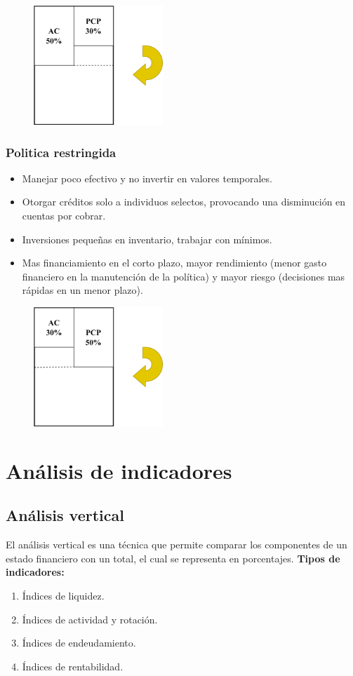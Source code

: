 \documentclass{templateNote}
\begin{document}
\begin{figure}[H]
    \centering
    \includegraphics[height=4.5cm]{img/polirelajada.png}
\end{figure}

\subsubsection{Politica restringida}
\begin{itemize}
    \item Manejar poco efectivo y no invertir en valores temporales.
    \item Otorgar créditos solo a individuos selectos, provocando una disminución en cuentas por cobrar.
    \item Inversiones pequeñas en inventario, trabajar con mínimos.
    \item Mas financiamiento en el corto plazo, mayor rendimiento (menor gasto financiero en la manutención de la política) y mayor riesgo (decisiones mas rápidas en un menor plazo).
\end{itemize}
\begin{figure}[H]
    \centering
    \includegraphics[height=4.5cm]{img/polirestrict.png}
\end{figure}
\newpage

\section{Análisis de indicadores}
\subsection{Análisis vertical}
\noindent El análisis vertical es una técnica que permite comparar los componentes de un estado financiero con un total, el cual se representa en porcentajes.
\textbf{Tipos de indicadores:}
\begin{enumerate}
    \item Índices de liquidez.
    \item Índices de actividad y rotación.
    \item Índices de endeudamiento.
    \item Índices de rentabilidad.
\end{enumerate}
\end{document}
